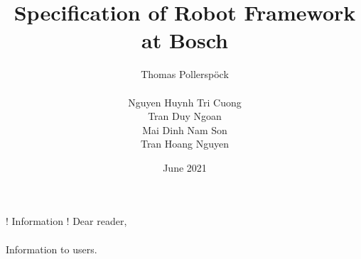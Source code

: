 \documentclass[a4paper,10pt]{report}
\begin{document}
\author{Thomas Pollerspöck \\ \\ Nguyen Huynh Tri Cuong \\ Tran Duy Ngoan \\ Mai Dinh Nam Son \\ Tran Hoang Nguyen}
\title{Specification of Robot Framework at Bosch}
\date{June 2021}


\maketitle

\begin{boxinfo}{! Information !}{
Dear reader, \\
\\
Information to users.
}
\end{boxinfo}

\tableofcontents

\listoftodos





\end{document}

